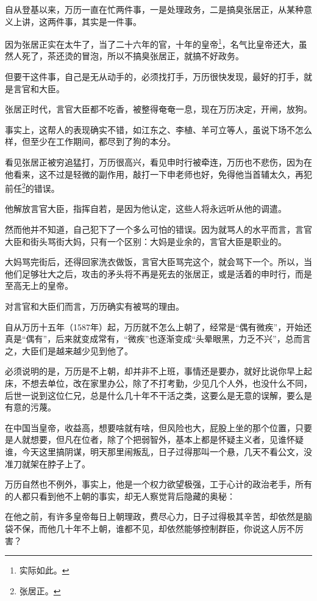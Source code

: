 \begin{multicols}{\theparacolNo}
		自从登基以来，万历一直在忙两件事，一是处理政务，二是搞臭张居正，从某种意义上讲，这两件事，其实是一件事。

		因为张居正实在太牛了，当了二十六年的官，十年的皇帝\footnote{实际如此。}，名气比皇帝还大，虽然人死了，茶还烫的冒泡，所以不搞臭张居正，就搞不好政务。

		但要干这件事，自己是无从动手的，必须找打手，万历很快发现，最好的打手，就是言官和大臣。

		张居正时代，言官大臣都不吃香，被整得奄奄一息，现在万历决定，开闸，放狗。

		事实上，这帮人的表现确实不错，如江东之、李植、羊可立等人，虽说下场不怎么样，但至少在工作期间，都尽到了狗的本分。

		看见张居正被穷追猛打，万历很高兴，看见申时行被牵连，万历也不悲伤，因为在他看来，这不过是轻微的副作用，敲打一下申老师也好，免得他当首辅太久，再犯前任\footnote{张居正。}的错误。

		他解放言官大臣，指挥自若，是因为他认定，这些人将永远听从他的调遣。

		然而他并不知道，自己犯下了一个多么可怕的错误。因为就骂人的水平而言，言官大臣和街头骂街大妈，只有一个区别：大妈是业余的，言官大臣是职业的。

		大妈骂完街后，还得回家洗衣做饭，言官大臣骂完这个，就会骂下一个。所以，当他们足够壮大之后，攻击的矛头将不再是死去的张居正，或是活着的申时行，而是至高无上的皇帝。

		对言官和大臣们而言，万历确实有被骂的理由。

		自从万历十五年（1587年）起，万历就不怎么上朝了，经常是“偶有微疾”，开始还真是“偶有”，后来就变成常有，“微疾”也逐渐变成“头晕眼黑，力乏不兴”，总而言之，大臣们是越来越少见到他了。

		必须说明的是，万历是不上朝，却并非不上班，事情还是要办，就好比说你早上起床，不想去单位，改在家里办公，除了不打考勤，少见几个人外，也没什么不同，后世一说到这位仁兄，总是什么几十年不干活之类，这要么是无意的误解，要么是有意的污蔑。

		在中国当皇帝，收益高，想要啥就有啥，但风险也大，屁股上坐的那个位置，只要是人就想要，但凡在位者，除了个把弱智外，基本上都是怀疑主义者，见谁怀疑谁，今天这里搞阴谋，明天那里闹叛乱，日子过得那叫一个悬，几天不看公文，没准刀就架在脖子上了。

		万历自然也不例外，事实上，他是一个权力欲望极强，工于心计的政治老手，所有的人都只看到他不上朝的事实，却无人察觉背后隐藏的奥秘：

		在他之前，有许多皇帝每日上朝理政，费尽心力，日子过得极其辛苦，却依然是脑袋不保，而他几十年不上朝，谁都不见，却依然能够控制群臣，你说这人厉不厉害？


\end{multicols}

